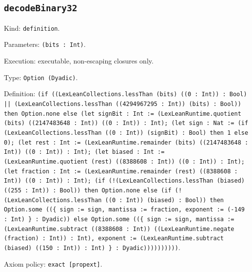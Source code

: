 \documentclass[11pt]{article}
\begin{document}
\subsection*{\texttt{decodeBinary32}}
\noindent Kind: \texttt{definition}.\par
\noindent Parameters: \texttt{(bits : Int)}.\par
\noindent Execution: executable, non-escaping closures only.\par
\noindent Type: \texttt{Option (Dyadic)}.\par
\noindent Definition: \texttt{(if ((LexLeanCollections.lessThan (bits) ((0 : Int)) : Bool) || (LexLeanCollections.lessThan ((4294967295 : Int)) (bits) : Bool)) then Option.none else (let signBit : Int := (LexLeanRuntime.quotient (bits) ((2147483648 : Int)) ((0 : Int)) : Int); (let sign : Nat := (if (LexLeanCollections.lessThan ((0 : Int)) (signBit) : Bool) then 1 else 0); (let rest : Int := (LexLeanRuntime.remainder (bits) ((2147483648 : Int)) ((0 : Int)) : Int); (let biased : Int := (LexLeanRuntime.quotient (rest) ((8388608 : Int)) ((0 : Int)) : Int); (let fraction : Int := (LexLeanRuntime.remainder (rest) ((8388608 : Int)) ((0 : Int)) : Int); (if (!(LexLeanCollections.lessThan (biased) ((255 : Int)) : Bool)) then Option.none else (if (!(LexLeanCollections.lessThan ((0 : Int)) (biased) : Bool)) then Option.some ((\{ sign := sign, mantissa := fraction, exponent := (-149 : Int) \} : Dyadic)) else Option.some ((\{ sign := sign, mantissa := (LexLeanRuntime.subtract ((8388608 : Int)) ((LexLeanRuntime.negate (fraction) : Int)) : Int), exponent := (LexLeanRuntime.subtract (biased) ((150 : Int)) : Int) \} : Dyadic))))))))))}.\par
\noindent Axiom policy: \texttt{exact [propext]}.\par
\end{document}
